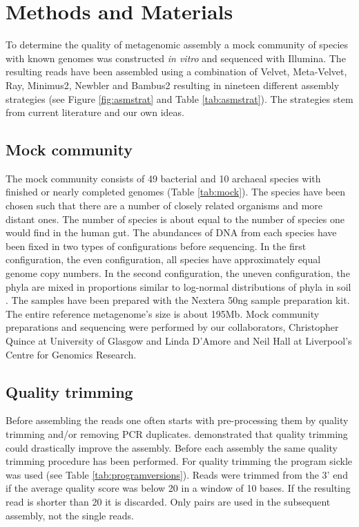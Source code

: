 \documentclass[a4paper,12pt]{report}
\begin{document}

\chapter{Methods and Materials} To determine the quality of metagenomic assembly a mock
community of species with known genomes was constructed {\em in vitro} and
sequenced with Illumina. The resulting reads have been assembled using a
combination of Velvet, Meta-Velvet, Ray, Minimus2, Newbler and Bambus2 resulting in
nineteen different assembly strategies (see Figure \ref{fig:asmstrat} and Table
\ref{tab:asmstrat}). The strategies stem from current literature and our own
ideas.

\section{Mock community} The mock community consists of 49 bacterial and 10
archaeal species with finished or nearly completed genomes (Table
\ref{tab:mock}). The species have been chosen such that there are a number of
closely related organisms and more distant ones. The number of species is about
equal to the number of species one would find in the human gut. The abundances
of DNA from each species have been fixed in two types of configurations before
sequencing. In the first configuration, the even configuration, all species
have approximately equal genome copy numbers. In the second configuration, the
uneven configuration, the phyla are mixed in proportions similar to log-normal
distributions of phyla in soil \cite{Doroghazi18682841}. The samples have been
prepared with the Nextera 50ng sample preparation kit. The entire reference
metagenome's size is about 195Mb. Mock community preparations and sequencing
were performed by our collaborators, Christopher Quince at University of
Glasgow and Linda D'Amore and Neil Hall at Liverpool's Centre for Genomics
Research.


\section{Quality trimming} Before assembling the reads one often starts with
pre-processing them by quality trimming and/or removing PCR duplicates.
\citet{Mende22384016} demonstrated that quality trimming could drastically
improve the assembly. Before each assembly the same quality trimming procedure
has been performed. For quality trimming the program sickle was used (see Table
\ref{tab:programversions}). Reads were trimmed from the 3' end if the average
quality score was below 20 in a window of 10 bases. If the resulting read is
shorter than 20 it is discarded. Only pairs are used in the subsequent
assembly, not the single reads.
\end{document}

